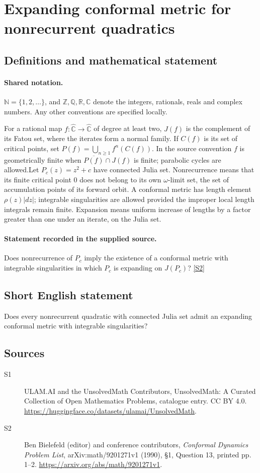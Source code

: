 \documentclass[11pt]{article}
\newcommand{\sref}[2]{\hyperlink{source:#1:#2}{[S#2]}}
\begin{document}
\section{Expanding conformal metric for nonrecurrent quadratics}\label{statement}

\subsection{Definitions and mathematical statement}

\paragraph{Shared notation.}$\mathbb N=\{1,2,\ldots\}$, and $\mathbb Z,\mathbb Q,\mathbb R,\mathbb C$ denote the integers, rationals, reals and complex numbers. Any other conventions are specified locally.


For a rational map $f:\widehat{\mathbb C}\to\widehat{\mathbb C}$ of degree at least two, $J(f)$ is the complement of its Fatou set, where the iterates form a normal family. If $C(f)$ is its set of critical points, set $P(f)=\bigcup_{n\geq1}f^n(C(f))$. In the source convention $f$ is geometrically finite when $\overline{P(f)}\cap J(f)$ is finite; parabolic cycles are allowed.Let $P_c(z)=z^2+c$ have connected Julia set. Nonrecurrence means that its finite critical point $0$ does not belong to its own $\omega$-limit set, the set of accumulation points of its forward orbit. A conformal metric has length element $\rho(z)|dz|$; integrable singularities are allowed provided the improper local length integrals remain finite. Expansion means uniform increase of lengths by a factor greater than one under an iterate, on the Julia set.
\paragraph{Statement recorded in the supplied source.}
Does nonrecurrence of $P_c$ imply the existence of a conformal metric with integrable singularities in which $P_c$ is expanding on $J(P_c)$? \sref{statement}{2}
\subsection{Short English statement}
Does every nonrecurrent quadratic with connected Julia set admit an expanding conformal metric with integrable singularities?
\subsection{Sources}
\begin{description}
\item[\hypertarget{source:statement:1}{S1}] ULAM.AI and the UnsolvedMath Contributors, UnsolvedMath: A Curated Collection of Open Mathematics Problems, catalogue entry. CC BY 4.0. \url{https://huggingface.co/datasets/ulamai/UnsolvedMath}.
\item[\hypertarget{source:statement:2}{S2}] Ben Bielefeld (editor) and conference contributors, \emph{Conformal Dynamics Problem List}, arXiv:math/9201271v1 (1990), \S1, Question 13, printed pp. 1--2. \url{https://arxiv.org/abs/math/9201271v1}.
\end{description}
\label{end:statement}
\end{document}

